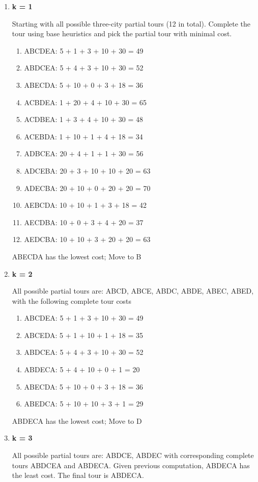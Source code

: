 \documentclass{homework}
\begin{document}
\begin{enumerate}
    \item \textbf{k = 1}
    
    Starting with all possible three-city partial tours (12 in total). Complete the tour using base heuristics and pick the partial tour with minimal cost.
    \begin{enumerate}
        \item ABCDEA: 5 + 1 + 3 + 10 + 30 = 49
        \item ABDCEA: 5 + 4 + 3 + 10 + 30 = 52
        \item ABECDA: 5 + 10 + 0 + 3 + 18 = 36
        \item ACBDEA: 1 + 20 + 4 + 10 + 30 = 65
        \item ACDBEA: 1 + 3 + 4 + 10 + 30 = 48
        \item ACEBDA: 1 + 10 + 1 + 4 + 18 = 34
        \item ADBCEA: 20 + 4 + 1 + 1 + 30 = 56
        \item ADCEBA: 20 + 3 + 10 + 10 + 20 = 63
        \item ADECBA: 20 + 10 + 0 + 20 + 20 = 70
        \item AEBCDA: 10 + 10 + 1 + 3 + 18 = 42
        \item AECDBA: 10 + 0 + 3 + 4 + 20 = 37
        \item AEDCBA: 10 + 10 + 3 + 20 + 20 = 63
    \end{enumerate}
    ABECDA has the lowest cost; Move to B
    \item \textbf{k = 2}
    
    All possible partial tours are: ABCD, ABCE, ABDC, ABDE, ABEC, ABED, with the following complete tour costs
    \begin{enumerate}
        \item ABCDEA: 5 + 1 + 3 + 10 + 30 = 49
        \item ABCEDA: 5 + 1 + 10 + 1 + 18 = 35
        \item ABDCEA: 5 + 4 + 3 + 10 + 30 = 52
        \item ABDECA: 5 + 4 + 10 + 0 + 1 = 20
        \item ABECDA: 5 + 10 + 0 + 3 + 18 = 36
        \item ABEDCA: 5 + 10 + 10 + 3 + 1 = 29
    \end{enumerate}
    ABDECA has the lowest cost; Move to D
    \item \textbf{k = 3}
    
    All possible partial tours are: ABDCE, ABDEC with corresponding complete tours ABDCEA and ABDECA. Given previous computation, ABDECA has the least cost.
    The final tour is ABDECA.
\end{enumerate}
\end{document}
